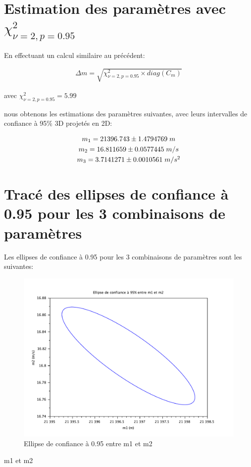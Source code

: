 \documentclass[12pt,a4paper]{extreport}
\begin{document}
\section{Estimation des paramètres avec $\chi_{\nu=2,p=0.95}^2$}
En effectuant un calcul similaire au précédent:

\begin{gather}
	\Delta m = \sqrt{\chi_{\nu=2,p=0.95}^2 \times diag(C_m)}
\end{gather}

avec $\chi_{\nu=2,p=0.95}^2 = 5.99$


nous obtenons les estimations des paramètres suivantes, avec leurs intervalles de confiance à 95\% 3D projetés en 2D:

\begin{equation}
	\begin{array}{c}
		m_1 = 21396.743 \pm 1.4794769\;m\\
		[\jot] m_2 = 16.811659 \pm 0.0577445\;m/s\\
		[\jot] m_3 = 3.7141271 \pm 0.0010561\;m/s^2
	\end{array}
\end{equation}

\section{Tracé des ellipses de confiance à 0.95 pour les 3 combinaisons de paramètres}

Les ellipses de confiance à 0.95 pour les 3 combinaisons de paramètres sont les suivantes:

\begin{figure}[h]
\begin{center}
\includegraphics[width=12cm]{../m1m2.pdf} 
\end{center}
\caption{Ellipse de confiance à 0.95 entre m1 et m2}
\end{figure}
m1 et m2
\newpage
\end{document}
